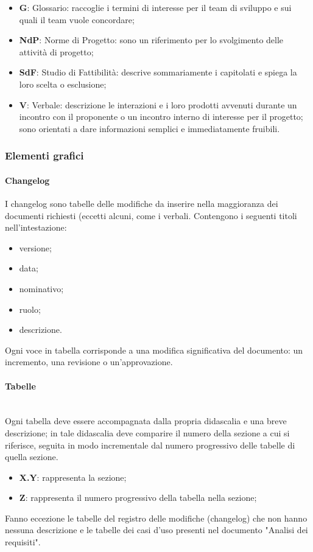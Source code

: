 		\begin{itemize}
			\item \textbf{G}: Glossario: raccoglie i termini di interesse per il team di sviluppo e sui quali il team vuole concordare;
			\item \textbf{NdP}: Norme di Progetto: sono un riferimento per lo svolgimento delle attività di progetto;
			\item \textbf{SdF}: Studio di Fattibilità: descrive sommariamente i capitolati e spiega la loro scelta o esclusione;
			\item \textbf{V}: Verbale: descrizione le interazioni e i loro prodotti avvenuti durante un incontro con il proponente o un incontro interno di interesse per il progetto; sono orientati a dare informazioni semplici e immediatamente fruibili. 
		\end{itemize}
		\subsubsection{Elementi grafici}
		\paragraph{Changelog}
		I changelog sono tabelle delle modifiche da inserire nella maggioranza dei documenti richiesti (eccetti alcuni, come i verbali. Contengono i seguenti titoli nell'intestazione:
		\begin{itemize}
			\item versione;
			\item data;
			\item nominativo;
			\item ruolo;
			\item descrizione.
		\end{itemize}
		Ogni voce in tabella corrisponde a una modifica significativa del documento: un incremento, una revisione o un'approvazione.
		\paragraph{Tabelle} \mbox{}\\
		Ogni tabella deve essere accompagnata dalla propria didascalia e una breve descrizione; in tale didascalia deve comparire il numero della sezione a cui si riferisce, seguita in modo incrementale dal numero progressivo delle tabelle di quella sezione.
		\begin{itemize}
			\item \textbf{{X.Y}}: rappresenta la sezione;
			\item \textbf{{Z}}: rappresenta il numero progressivo della tabella nella sezione;
		\end{itemize}
		Fanno eccezione le tabelle del registro delle modifiche (changelog) che non hanno nessuna descrizione e le tabelle dei casi d’uso presenti nel documento
		"Analisi dei requisiti".

